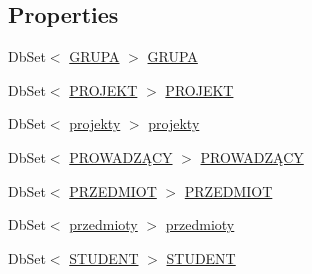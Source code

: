 \subsection*{Properties}
\begin{DoxyCompactItemize}
\item 
Db\+Set$<$ \hyperlink{class_dziennik_ocen_web2_1_1_g_r_u_p_a}{G\+R\+U\+PA} $>$ \hyperlink{class_dziennik_ocen_web2_1_1_dziennik_ocen_entities_ab13ca42decd07b8192af9f6119bc59de}{G\+R\+U\+PA}
\item 
Db\+Set$<$ \hyperlink{class_dziennik_ocen_web2_1_1_p_r_o_j_e_k_t}{P\+R\+O\+J\+E\+KT} $>$ \hyperlink{class_dziennik_ocen_web2_1_1_dziennik_ocen_entities_a54d68132f5c42eef109e851010e11da9}{P\+R\+O\+J\+E\+KT}
\item 
Db\+Set$<$ \hyperlink{class_dziennik_ocen_web2_1_1projekty}{projekty} $>$ \hyperlink{class_dziennik_ocen_web2_1_1_dziennik_ocen_entities_aa3c51299884a923f965cb752327cb262}{projekty}
\item 
Db\+Set$<$ \hyperlink{class_dziennik_ocen_web2_1_1_p_r_o_w_a_d_z_xC4_x84_c_y}{P\+R\+O\+W\+A\+D\+ZĄ\+CY} $>$ \hyperlink{class_dziennik_ocen_web2_1_1_dziennik_ocen_entities_a5a16ff31fa82dac4e34ef4b7567dc69f}{P\+R\+O\+W\+A\+D\+ZĄ\+CY}
\item 
Db\+Set$<$ \hyperlink{class_dziennik_ocen_web2_1_1_p_r_z_e_d_m_i_o_t}{P\+R\+Z\+E\+D\+M\+I\+OT} $>$ \hyperlink{class_dziennik_ocen_web2_1_1_dziennik_ocen_entities_a88674504492aa9e05e74b2816501674f}{P\+R\+Z\+E\+D\+M\+I\+OT}
\item 
Db\+Set$<$ \hyperlink{class_dziennik_ocen_web2_1_1przedmioty}{przedmioty} $>$ \hyperlink{class_dziennik_ocen_web2_1_1_dziennik_ocen_entities_ae46ef315cbd71e340160ce2f680479dd}{przedmioty}
\item 
Db\+Set$<$ \hyperlink{class_dziennik_ocen_web2_1_1_s_t_u_d_e_n_t}{S\+T\+U\+D\+E\+NT} $>$ \hyperlink{class_dziennik_ocen_web2_1_1_dziennik_ocen_entities_ae6800c45c0cb8ea55ca7bb8a767d9763}{S\+T\+U\+D\+E\+NT}
\end{DoxyCompactItemize}


